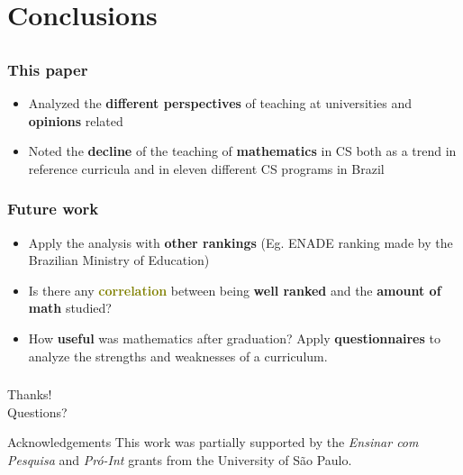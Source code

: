 \documentclass{beamer}
\begin{document}
\section{Conclusions}
\subsection{}

\begin{frame}
\frametitle{This paper}
\begin{itemize}
	\item Analyzed the \textbf{\textcolor{n_red}{different perspectives}} of
	teaching at universities and \textbf{\textcolor{n_green}{opinions}} related
	\item Noted the \textbf{\textcolor{n_violet}{decline}} of the teaching of
	\textbf{\textcolor{RawSienna}{mathematics}} in CS both as a trend in reference
	curricula and in eleven
	different CS programs in Brazil
\end{itemize}
\end{frame}

\begin{frame}
\frametitle{Future work}
\begin{itemize}
	\item Apply the analysis with \textbf{\textcolor{n_red}{other rankings}}
	(Eg. ENADE ranking made by the Brazilian Ministry of Education)
	\item Is there any \textbf{\textcolor{olive}{correlation}} between being
	\textbf{\textcolor{n_violet}{well ranked}} and the
	\textbf{\textcolor{RawSienna}{amount of math}} studied?
	\item How \textbf{\textcolor{n_green}{useful}} was mathematics after
	graduation? Apply \textbf{\textcolor{n_blue}{questionnaires}} to
	analyze the strengths and weaknesses of
	a curriculum.
\end{itemize}
\end{frame}

\begin{frame}
\frametitle{}

\begin{center}
\Huge Thanks! \\
\Large Questions?
\end{center}

\begin{block}{Acknowledgements}
This work was partially supported by the \emph{Ensinar com Pesquisa} and
\emph{Pró-Int} grants from the University of São Paulo.
\end{block}

\end{frame}
\end{document}
